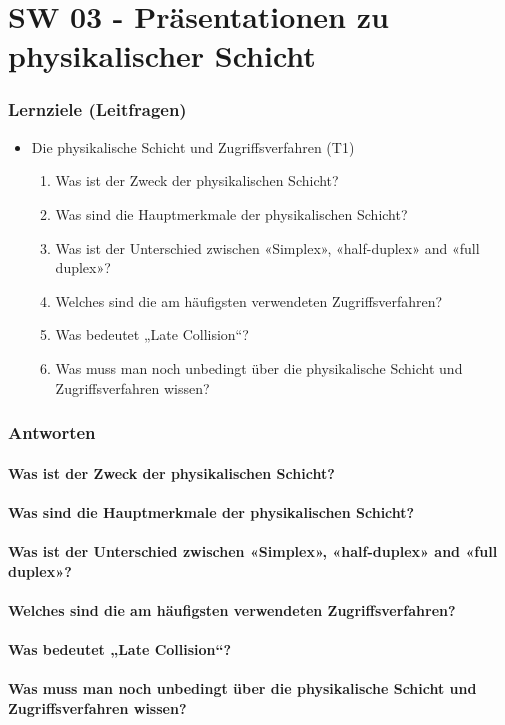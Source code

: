 \part{SW 03 - Präsentationen zu physikalischer Schicht}
\section{Lernziele (Leitfragen)}
\begin{itemize}
    \item Die physikalische Schicht und Zugriffsverfahren (T1)
    \begin{enumerate}
        \item Was ist der Zweck der physikalischen Schicht?
        \item Was sind die Hauptmerkmale der physikalischen Schicht?
        \item Was ist der Unterschied zwischen «Simplex», «half-duplex» and «full duplex»?
        \item Welches sind die am häufigsten verwendeten Zugriffsverfahren?
        \item Was bedeutet „Late Collision“?
        \item Was muss man noch unbedingt über die physikalische Schicht und Zugriffsverfahren wissen?
    \end{enumerate}

\end{itemize}

\section{Antworten}
\subsection*{Was ist der Zweck der physikalischen Schicht?}
\subsection*{Was sind die Hauptmerkmale der physikalischen Schicht?}
\subsection*{Was ist der Unterschied zwischen «Simplex», «half-duplex» and «full duplex»?}
\subsection*{Welches sind die am häufigsten verwendeten Zugriffsverfahren?}
\subsection*{Was bedeutet „Late Collision“?}
\subsection*{Was muss man noch unbedingt über die physikalische Schicht und Zugriffsverfahren wissen?}